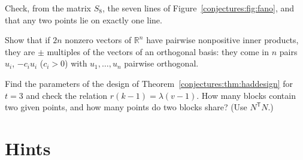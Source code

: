 \begin{exercise}[$\star$]\label{conjectures:ex:fano}
Check, from the matrix $S_8$, the seven lines of Figure~\ref{conjectures:fig:fano}, and that any two points lie on exactly one line.
\end{exercise}

\begin{exercise}[$\star\star$]\label{conjectures:ex:obtuseeq}
Show that if $2n$ nonzero vectors of $\mathbb R^n$ have pairwise nonpositive inner products, they are $\pm$ multiples of the vectors of an orthogonal
basis: they come in $n$ pairs $u_i$, $-c_iu_i$ ($c_i>0$) with $u_1,\dots,u_n$ pairwise orthogonal.
\end{exercise}

\begin{exercise}[$\star$]\label{conjectures:ex:biplane}
Find the parameters of the design of Theorem~\ref{conjectures:thm:haddesign} for $t=3$ and check the relation $r(k-1)=\lambda(v-1)$. How many blocks contain two
given points, and how many points do two blocks share? (Use $N^{\mathsf T}N$.)
\end{exercise}

\section{Hints}

